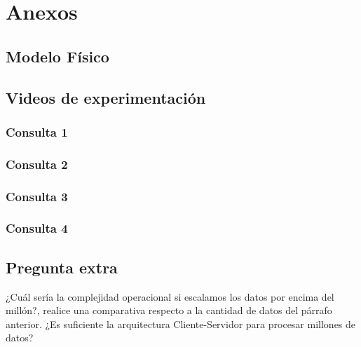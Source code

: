 \section{Anexos}
\subsection{Modelo Físico}

\subsection{Videos de experimentación}
\subsubsection{Consulta 1}
\subsubsection{Consulta 2}
\subsubsection{Consulta 3}
\subsubsection{Consulta 4}

\subsection{Pregunta extra}
¿Cuál sería la complejidad operacional si escalamos los datos por encima del millón?, realice una comparativa respecto a la cantidad de datos del párrafo anterior. ¿Es suficiente la arquitectura Cliente-Servidor para procesar millones de datos?